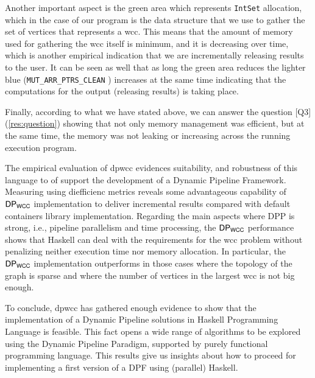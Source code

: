 Another important aspect is the green area which represents \texttt{IntSet} allocation, which in the case of our program is the data structure that we use to gather the set of vertices that represents a \acrshort{wcc}. This means that the amount of memory used for gathering the \acrshort{wcc} itself is minimum, and it is decreasing over time, which is another empirical indication that we are incrementally releasing results to the user. It can be seen as well that as long the green area reduces the lighter blue (\texttt{MUT_ARR_PTRS_CLEAN} \cite{ghcheap}) increases at the same time indicating that the computations for the output (releasing results) is taking place. 

Finally, according to what we have stated above, we can answer the question [Q3] (\autoref{res:question}) showing that not only memory management was efficient, but at the same time, the memory was not leaking or increasing across the running execution program.

The empirical evaluation of \acrshort{dpwcc} evidences suitability, and robustness of this language to of  support the development of a Dynamic Pipeline Framework. Measuring using diefficienc metrics reveals some advantageous capability of $\mathsf{DP_{WCC}}$ implementation to deliver incremental results compared with default containers library implementation.  Regarding the main aspects where DPP is strong, i.e., pipeline parallelism and time processing, the $\mathsf{DP_{WCC}}$ performance shows that Haskell can deal with the requirements for the \acrshort{wcc} problem without penalizing neither execution time nor memory allocation. In particular, the $\mathsf{DP_{WCC}}$ implementation outperforms in those cases where the topology of the graph is sparse and where the number of vertices in the largest \acrshort{wcc} is not big enough.  

To conclude, \acrshort{dpwcc} has gathered enough evidence to show that the implementation of a Dynamic Pipeline solutions in Haskell Programming Language is feasible. This fact opens a wide range of algorithms to be explored using the Dynamic Pipeline Paradigm, supported by purely functional programming language. This results give us insights about how to proceed for implementing a first version of a DPF using (parallel) Haskell.